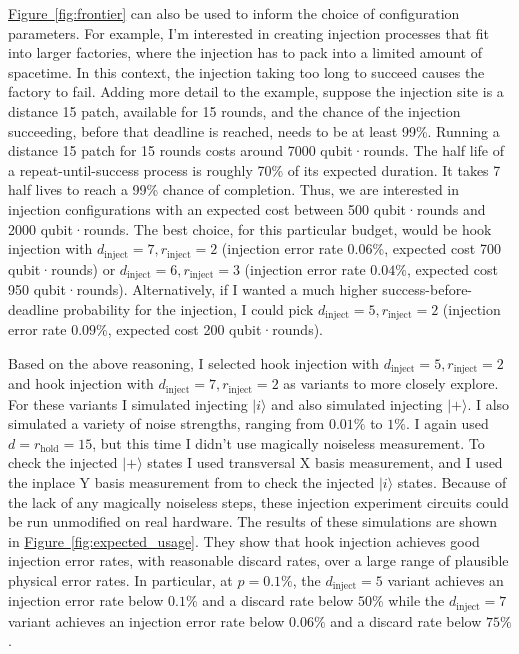 \documentclass[onecolumn,unpublished,a4paper]{quantumarticle}
\theoremstyle{definition}
\theoremstyle{definition}
\theoremstyle{definition}
\newcommand{\fig}[1]{\hyperref[fig:#1]{Figure~\ref*{fig:#1}}}
\begin{document}
\fig{frontier} can also be used to inform the choice of configuration parameters.
For example, I'm interested in creating injection processes that fit into larger factories, where the injection has to pack into a limited amount of spacetime.
In this context, the injection taking too long to succeed causes the factory to fail.
Adding more detail to the example, suppose the injection site is a distance 15 patch, available for 15 rounds, and the chance of the injection succeeding, before that deadline is reached, needs to be at least 99\%.
Running a distance 15 patch for 15 rounds costs around 7000 qubit·rounds.
The half life of a repeat-until-success process is roughly 70\% of its expected duration.
It takes 7 half lives to reach a 99\% chance of completion.
Thus, we are interested in injection configurations with an expected cost between 500 qubit·rounds and 2000 qubit·rounds.
The best choice, for this particular budget, would be hook injection with $d_\text{inject}=7,r_\text{inject}=2$ (injection error rate $0.06\%$, expected cost 700 qubit·rounds) or $d_\text{inject}=6,r_\text{inject}=3$ (injection error rate $0.04\%$, expected cost 950 qubit·rounds).
Alternatively, if I wanted a much higher success-before-deadline probability for the injection, I could pick $d_\text{inject}=5,r_\text{inject}=2$ (injection error rate $0.09\%$, expected cost 200 qubit·rounds).

Based on the above reasoning, I selected hook injection with $d_\text{inject}=5,r_\text{inject}=2$ and hook injection with 
$d_\text{inject}=7,r_\text{inject}=2$ as variants to more closely explore.
For these variants I simulated injecting $|i\rangle$ and also simulated injecting $|+\rangle$.
I also simulated a variety of noise strengths, ranging from $0.01\%$ to $1\%$.
I again used $d=r_\text{hold}=15$, but this time I didn't use magically noiseless measurement.
To check the injected $|+\rangle$ states I used transversal X basis measurement, and I used the inplace Y basis measurement from \cite{gidney2023ybasis} to check the injected $|i\rangle$ states.
Because of the lack of any magically noiseless steps, these injection experiment circuits could be run unmodified on real hardware.
The results of these simulations are shown in \fig{expected_usage}.
They show that hook injection achieves good injection error rates, with reasonable discard rates, over a large range of plausible physical error rates.
In particular, at $p=0.1\%$, the $d_\text{inject}=5$ variant achieves an injection error rate below $0.1\%$ and a discard rate below $50\%$ while the $d_\text{inject}=7$ variant achieves an injection error rate below $0.06\%$ and a discard rate below $75\%$.
\end{document}
